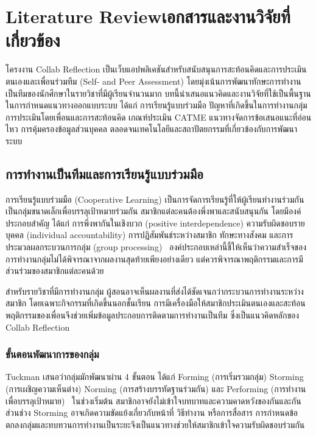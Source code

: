 \chapter{\ifenglish Literature Review\else เอกสารและงานวิจัยที่เกี่ยวข้อง\fi}\label{ch:background}

โครงงาน Collab Reflection เป็นเว็บแอปพลิเคชันสำหรับสนับสนุนการสะท้อนคิดและการประเมินตนเองและเพื่อนร่วมทีม (Self- and Peer Assessment) โดยมุ่งเน้นการพัฒนาทักษะการทำงานเป็นทีมของนักศึกษาในรายวิชาที่มีผู้เรียนจำนวนมาก บทนี้นำเสนอแนวคิดและงานวิจัยที่ใช้เป็นพื้นฐานในการกำหนดแนวทางออกแบบระบบ ได้แก่ การเรียนรู้แบบร่วมมือ ปัญหาที่เกิดขึ้นในการทำงานกลุ่ม การประเมินโดยเพื่อนและการสะท้อนคิด เกณฑ์ประเมิน CATME แนวทางจัดการข้อเสนอแนะที่อ่อนไหว การคุ้มครองข้อมูลส่วนบุคคล ตลอดจนเทคโนโลยีและสถาปัตยกรรมที่เกี่ยวข้องกับการพัฒนาระบบ

\section{การทำงานเป็นทีมและการเรียนรู้แบบร่วมมือ}

การเรียนรู้แบบร่วมมือ (Cooperative Learning) เป็นการจัดการเรียนรู้ที่ให้ผู้เรียนทำงานร่วมกันเป็นกลุ่มขนาดเล็กเพื่อบรรลุเป้าหมายร่วมกัน สมาชิกแต่ละคนต้องพึ่งพาและสนับสนุนกัน โดยมีองค์ประกอบสำคัญ ได้แก่ การพึ่งพากันในเชิงบวก (positive interdependence) ความรับผิดชอบรายบุคคล (individual accountability) การปฏิสัมพันธ์ระหว่างสมาชิก ทักษะทางสังคม และการประมวลผลกระบวนการกลุ่ม (group processing)~\cite{johnson1998active} องค์ประกอบเหล่านี้ชี้ให้เห็นว่าความสำเร็จของการทำงานกลุ่มไม่ได้พิจารณาจากผลงานสุดท้ายเพียงอย่างเดียว แต่ควรพิจารณาพฤติกรรมและการมีส่วนร่วมของสมาชิกแต่ละคนด้วย

สำหรับรายวิชาที่มีการทำงานกลุ่ม ผู้สอนอาจเห็นผลงานที่ส่งได้ชัดเจนกว่ากระบวนการทำงานระหว่างสมาชิก โดยเฉพาะกิจกรรมที่เกิดขึ้นนอกชั้นเรียน การมีเครื่องมือให้สมาชิกประเมินตนเองและสะท้อนพฤติกรรมของเพื่อนจึงช่วยเพิ่มข้อมูลประกอบการติดตามการทำงานเป็นทีม ซึ่งเป็นแนวคิดหลักของ Collab Reflection

\subsection{ขั้นตอนพัฒนาการของกลุ่ม}

Tuckman เสนอว่ากลุ่มมักพัฒนาผ่าน 4 ขั้นตอน ได้แก่ Forming (การเริ่มรวมกลุ่ม) Storming (การเผชิญความเห็นต่าง) Norming (การสร้างบรรทัดฐานร่วมกัน) และ Performing (การทำงานเพื่อบรรลุเป้าหมาย)~\cite{tuckman1965developmental} ในช่วงเริ่มต้น สมาชิกอาจยังไม่เข้าใจบทบาทและความคาดหวังของกันและกัน ส่วนช่วง Storming อาจเกิดความขัดแย้งเกี่ยวกับหน้าที่ วิธีทำงาน หรือการสื่อสาร การกำหนดข้อตกลงกลุ่มและทบทวนการทำงานเป็นระยะจึงเป็นแนวทางช่วยให้สมาชิกเข้าใจความรับผิดชอบร่วมกัน

